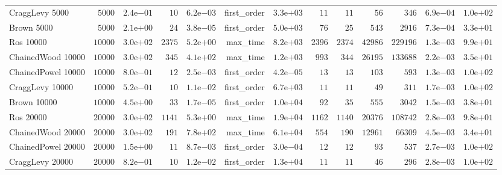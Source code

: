 \begin{longtable}[c]{lrrrrrrrrrrrr}
CraggLevy 5000 & \( 5000\) & \( 2.4\)e\(-01\) & \(   10\) & \( 6.2\)e\(-03\) & first\_order & \( 3.3\)e\(+03\) & \(   11\) & \(   11\) & \(   56\) & \(  346\) & \( 6.9\)e\(-04\) & \( 1.0\)e\(+02\) \\
Brown 5000 & \( 5000\) & \( 2.1\)e\(+00\) & \(   24\) & \( 3.8\)e\(-05\) & first\_order & \( 5.0\)e\(+03\) & \(   76\) & \(   25\) & \(  543\) & \( 2916\) & \( 7.3\)e\(-04\) & \( 3.3\)e\(+01\) \\
Ros 10000 & \(10000\) & \( 3.0\)e\(+02\) & \( 2375\) & \( 5.2\)e\(+00\) & max\_time & \( 8.2\)e\(+03\) & \( 2396\) & \( 2374\) & \(42986\) & \(229196\) & \( 1.3\)e\(-03\) & \( 9.9\)e\(+01\) \\
ChainedWood 10000 & \(10000\) & \( 3.0\)e\(+02\) & \(  345\) & \( 4.1\)e\(+02\) & max\_time & \( 1.2\)e\(+03\) & \(  993\) & \(  344\) & \(26195\) & \(133688\) & \( 2.2\)e\(-03\) & \( 3.5\)e\(+01\) \\
ChainedPowel 10000 & \(10000\) & \( 8.0\)e\(-01\) & \(   12\) & \( 2.5\)e\(-03\) & first\_order & \( 4.2\)e\(-05\) & \(   13\) & \(   13\) & \(  103\) & \(  593\) & \( 1.3\)e\(-03\) & \( 1.0\)e\(+02\) \\
CraggLevy 10000 & \(10000\) & \( 5.2\)e\(-01\) & \(   10\) & \( 1.1\)e\(-02\) & first\_order & \( 6.7\)e\(+03\) & \(   11\) & \(   11\) & \(   49\) & \(  311\) & \( 1.7\)e\(-03\) & \( 1.0\)e\(+02\) \\
Brown 10000 & \(10000\) & \( 4.5\)e\(+00\) & \(   33\) & \( 1.7\)e\(-05\) & first\_order & \( 1.0\)e\(+04\) & \(   92\) & \(   35\) & \(  555\) & \( 3042\) & \( 1.5\)e\(-03\) & \( 3.8\)e\(+01\) \\
Ros 20000 & \(20000\) & \( 3.0\)e\(+02\) & \( 1141\) & \( 5.3\)e\(+00\) & max\_time & \( 1.9\)e\(+04\) & \( 1162\) & \( 1140\) & \(20376\) & \(108742\) & \( 2.8\)e\(-03\) & \( 9.8\)e\(+01\) \\
ChainedWood 20000 & \(20000\) & \( 3.0\)e\(+02\) & \(  191\) & \( 7.8\)e\(+02\) & max\_time & \( 6.1\)e\(+04\) & \(  554\) & \(  190\) & \(12961\) & \(66309\) & \( 4.5\)e\(-03\) & \( 3.4\)e\(+01\) \\
ChainedPowel 20000 & \(20000\) & \( 1.5\)e\(+00\) & \(   11\) & \( 8.7\)e\(-03\) & first\_order & \( 3.0\)e\(-04\) & \(   12\) & \(   12\) & \(   93\) & \(  537\) & \( 2.7\)e\(-03\) & \( 1.0\)e\(+02\) \\
CraggLevy 20000 & \(20000\) & \( 8.2\)e\(-01\) & \(   10\) & \( 1.2\)e\(-02\) & first\_order & \( 1.3\)e\(+04\) & \(   11\) & \(   11\) & \(   46\) & \(  296\) & \( 2.8\)e\(-03\) & \( 1.0\)e\(+02\) \\

\end{longtable}
